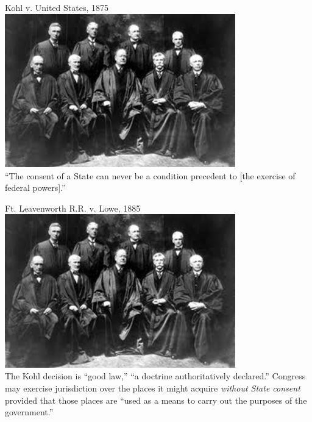 \begin{frame}{Kohl v. United States, 1875}
    \centering
    \includegraphics[width=0.75\textwidth]{img/sc-1905.png} \\
    { \large ``The consent of a State can never be a condition precedent to [the exercise of federal powers].'' }
\end{frame}

\begin{frame}{Ft. Leavenworth R.R. v. Lowe, 1885}
    \centering
    \includegraphics[width=0.75\textwidth]{img/sc-1905.png} \\
    The Kohl decision is ``good law,'' ``a doctrine authoritatively declared.'' Congress may exercise jurisdiction over the places it might acquire \emph{without State consent} provided that those places are ``used as a means to carry out the purposes of the government.''
\end{frame}

